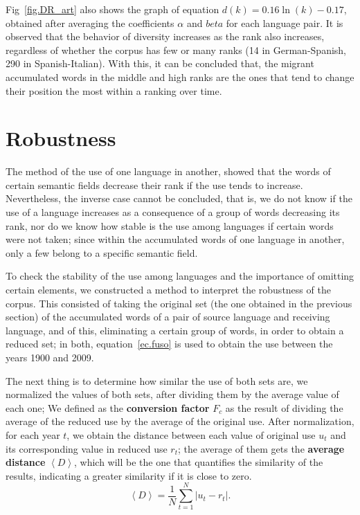 \documentclass[10pt,letterpaper]{article} %
\begin{document}
Fig~\ref{fig.DR_art} also shows the graph of equation $d(k) = 0.16\ln(k) - 0.17$, obtained after averaging the coefficients $\alpha$ and $beta$ for each language pair. It is observed that the behavior of diversity increases as the rank also increases, regardless of whether the corpus has few or many ranks (14 in German-Spanish, 290 in Spanish-Italian). With this, it can be concluded that, the migrant accumulated words in the middle and high ranks are the ones that tend to change their position the most within a ranking over time.



\section*{Robustness} %

The method of the use of one language in another, showed that the words of certain semantic fields decrease their rank if the use tends to increase. Nevertheless, the inverse case cannot be concluded, that is, we do not know if the use of a language increases as a consequence of a group of words decreasing its rank, nor do we know how stable is the use among languages ​​if certain words were not taken; since within the accumulated words of one language in another, only a few belong to a specific semantic field.

To check the stability of the use among languages and the importance of omitting certain elements, we constructed a method to interpret the robustness of the corpus. This consisted of taking the original set (the one obtained in the previous section) of the accumulated words of a pair of source language and receiving language, and of this, eliminating a certain group of words, in order to obtain a reduced set; in both,  equation~\ref{ec.fuso} is used to obtain the use between the years 1900 and 2009.

The next thing is to determine how similar the use of both sets are, we normalized the values of both sets, after dividing them by the average value of each one; We defined as the \textbf{conversion factor} $F_{c}$ as the result of dividing the average of the reduced use by the average of the original use. After normalization, for each year $t$, we obtain the distance between each value of original use $u_{t}$ and its corresponding value in reduced use $r_{t}$; the average of them gets the \textbf{average distance} $\left\langle D \right\rangle$, which will be the one that quantifies the similarity of the results, indicating a greater similarity if it is close to zero.
\begin{equation}
\left\langle D \right\rangle  = \frac{1}{N}\sum_{t=1}^{N} \left| u_{t} - r_{t} \right|  .
\label{ec.Davg}
\end{equation}
\end{document}
